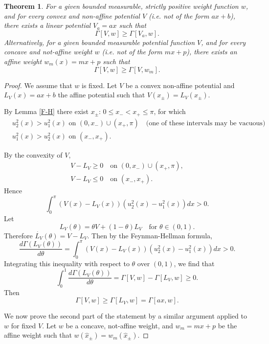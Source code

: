 \documentclass[12pt,a4paper]{amsart}
\newtheorem{thm}{Theorem}[section]
\begin{document}
\begin{thm}\label{step}
For a given bounded measurable, strictly positive weight function $w$, and for every convex 
and non-affine potential $V$ (i.e. not of the form $ax+b$), there exists a linear potential $V_{a}=ax$ such that
$$
 \Gamma[V,w] \geq  \Gamma[V_{a},w].$$
Alternatively, for a given  
bounded measurable potential function $V$, and for every concave and not-affine
weight $w$ (i.e. not of the form $mx+p$), there exists an affine weight $w_m(x)=mx+p$ such that 
$$
 \Gamma[V,w] \geq  \Gamma[V,w_m].$$  
\end{thm}

\begin{proof}  

We assume that $w$ is fixed. 
Let $V$ be a convex non-affine potential and $L_{V}(x)=ax+b$ the affine potential 
such that $V(x_{\pm})=L_{V}(x_{\pm})$.


\noindent By Lemma \ref{F-H} there exist $x_{\pm}$: $0\leqslant x_{-}<x_{+}\leqslant \pi$, for which 
\begin{align*}
    &u_{2}^{2}(x)>u_{1}^{2}(x) \textrm{ on } (0,x_{-})\cup (x_{+},\pi)\quad\textrm{(one of these intervals may be vacuous)}\\
    &u_{1}^{2}(x)>u_{2}^{2}(x) \textrm{ on } (x_{-},x_{+}).
\end{align*}
 
\noindent By the convexity of $V$,
\begin{gather*}
 V-L_{V}\geq 0 \quad \text{on } (0,x_{-})\cup (x_{+},\pi), \\
 V-L_{V}\leq 0 \quad \text{on } (x_{-},x_{+}). 
\end{gather*}
Hence 
$$
\int_0^{\pi}(V(x)-L_{V}(x))(u_2^2(x)-u_1^2(x))dx >0.
$$
Let
\[
 L_{V}(\theta)=\theta V+(1-\theta)L_{V}\quad\text{for }\theta\in(0,1).
\]
 Therefore $\dot{L_{V}}(\theta)=V-L_{V}$.
Then by the Feynman-Hellman formula,
$$
\frac{d\Gamma(L_{V}(\theta))}{d\theta}=
\int_0^{\pi}(V(x)-L_{V}(x))(u_2^2(x)-u_1^2(x))dx >0.
$$
Integrating this inequality with respect to $\theta$ over $(0,1)$, we find that
$$
\int_0^{1}\frac{d\Gamma(L_{V}(\theta))}{d\theta}=\Gamma[V,w]-\Gamma[L_{V},w]\geq 0.
$$
Then $$ \Gamma[V,w]\geq \Gamma[L_{V},w]=\Gamma[ax,w].$$

We now prove the second part of the statement by a similar argument applied to $w$ for fixed $V$.
Let $w$ be a concave, not-affine weight, and $w_{m}=mx+p$ be the affine weight such that $w(\widehat{x}_{\pm})=w_{m}(\widehat{x}_{\pm})$.



\end{proof}
\end{document}
